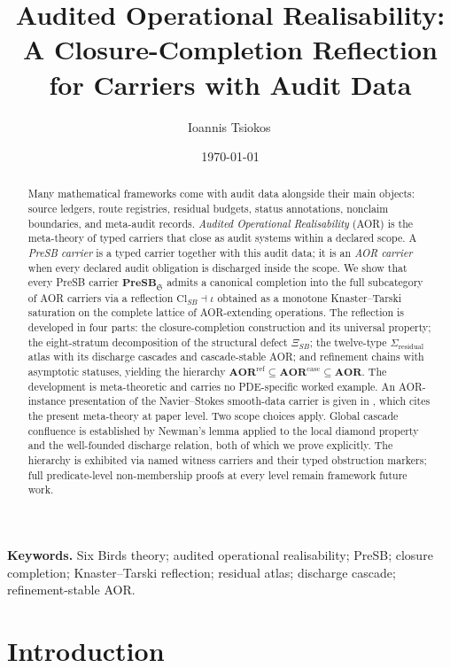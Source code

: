 \documentclass[11pt]{article}
\title{Audited Operational Realisability:\\
A Closure-Completion Reflection for Carriers with Audit Data}
\author{Ioannis Tsiokos\,\orcidlink{0009-0009-7659-5964}}
\date{\today}
\newcommand{\PreSB}{\mathbf{PreSB}}
\newcommand{\AOR}{\mathbf{AOR}}
\newcommand{\CascadeStableAOR}{\mathbf{AOR}^{\mathrm{casc}}}
\newcommand{\RefStableAOR}{\mathbf{AOR}^{\mathrm{ref}}}
\newcommand{\ClSB}{\mathrm{Cl}_{SB}}
\newcommand{\XiSB}{\Xi_{SB}}
\theoremstyle{definition}
\begin{document}
\maketitle
\thispagestyle{firstpage}

\begin{abstract}
Many mathematical frameworks come with audit data alongside their
main objects: source ledgers, route registries, residual budgets,
status annotations, nonclaim boundaries, and meta-audit records.
\emph{Audited Operational Realisability} (AOR) is the meta-theory of
typed carriers that close as audit systems within a declared scope.
A \emph{PreSB carrier} is a typed carrier together with this audit
data; it is an \emph{AOR carrier} when every declared audit
obligation is discharged inside the scope.  We show that every PreSB
carrier \(\PreSB_{\mathfrak S}\) admits a canonical completion into
the full subcategory of AOR carriers via a reflection
\(\ClSB\dashv\iota\) obtained as a monotone Knaster--Tarski
saturation on the complete lattice of AOR-extending operations.  The
reflection is developed in four parts: the closure-completion
construction and its universal property; the eight-stratum
decomposition of the structural defect \(\XiSB\); the twelve-type
\(\Sigma_{\mathrm{residual}}\) atlas with its discharge cascades and
cascade-stable AOR; and refinement chains with asymptotic statuses,
yielding the hierarchy
\(\RefStableAOR\subseteq\CascadeStableAOR\subseteq\AOR\).  The
development is meta-theoretic and carries no PDE-specific worked
example.  An AOR-instance presentation of the Navier--Stokes
smooth-data carrier is given in \citet{Tsiokos2026NavierStokes},
which cites the present meta-theory at paper level.  Two scope
choices apply.  Global cascade confluence is established by Newman's
lemma applied to the local diamond property and the well-founded
discharge relation, both of which we prove explicitly.  The hierarchy
is exhibited via named witness carriers and their typed obstruction
markers; full predicate-level non-membership proofs at every level
remain framework future work.
\end{abstract}

\medskip
\noindent\textbf{Keywords.} Six Birds theory; audited operational realisability; PreSB; closure completion; Knaster--Tarski reflection; residual atlas; discharge cascade; refinement-stable AOR.

\section{Introduction}\label{sec:aor-intro}
\end{document}
